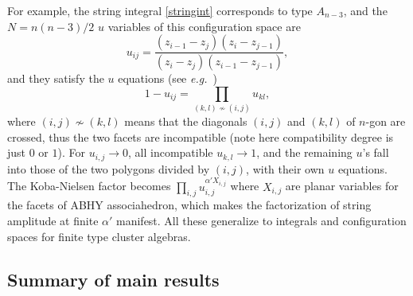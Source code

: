 \documentclass[hidelinks,12pt]{article}
\begin{document}
For example, the string integral \eqref{stringint} corresponds to type $A_{n{-}3}$, %
and the $N=n(n{-}3)/2$ $u$ variables of this configuration space are~\cite{Arkani-Hamed:2020cig}
\[
	u_{i j}=\frac{(z_{i-1}-z_j)(z_i-z_{j-1})}{(z_i-z_j)(z_{i-1}-z_{j-1})},
\]
and they satisfy the $u$ equations (see {\it e.g.}~\cite{Brown:2009qja})
\begin{equation}\label{Aueq}
	1-u_{ij}=\prod_{(k,l)\not\sim (i,j)} u_{kl},
\end{equation}
where $(i,j)\not\sim (k,l)$ means that the diagonals $(i,j)$ and $(k,l)$ of $n$-gon are crossed, thus the two facets are incompatible (note here compatibility degree is just $0$ or $1$).  For $u_{i,j}\to 0$, all incompatible $u_{k,l} \to 1$, and the remaining $u$'s fall into those of the two polygons divided by $(i,j)$, with their own $u$ equations. The Koba-Nielsen factor becomes $\prod_{i,j} u_{i,j}^{\alpha' X_{i,j}}$ where $X_{i,j}$ are planar variables for the facets of ABHY associahedron, which makes the factorization of string amplitude at finite $\alpha'$ manifest. All these generalize to integrals and configuration spaces for finite type cluster algebras. 

\subsection{Summary of main results}
\end{document}
